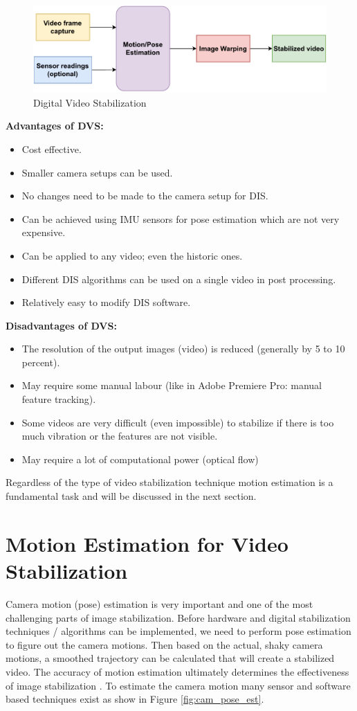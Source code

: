 \begin{figure}[H]
\centering
\includegraphics[scale=0.75]{images/fig_chapter2/2_1_dis.pdf}
\caption{Digital Video Stabilization}
\label{fig:dis}
\end{figure}

\textbf{Advantages of DVS: }
\begin{itemize}
\item Cost effective.
\item Smaller camera setups can be used.
\item No changes need to be made to the camera setup for DIS.
\item Can be achieved using IMU sensors for pose estimation which are not very expensive.
\item Can be applied to any video; even the historic ones.
\item Different DIS algorithms can be used on a single video in post processing.
\item Relatively easy to modify DIS software.
\end{itemize}

\textbf{Disadvantages of DVS:}
\begin{itemize}
\item The resolution of the output images (video) is reduced (generally by 5 to 10 percent).
\item May require some manual labour (like in Adobe Premiere Pro: manual feature tracking).
\item Some videos are very difficult (even impossible) to stabilize if there is too much vibration or the features are not visible.
\item May require a lot of computational power (optical flow)
\end{itemize}

Regardless of the type of video stabilization technique motion estimation is a fundamental task and will be discussed in the next section.

\section{Motion Estimation for Video Stabilization}
\label{sec:motion_estimation}
Camera motion (pose) estimation is very important and one of the most challenging parts of image stabilization. Before hardware and digital stabilization techniques / algorithms can be implemented, we need to perform pose estimation to figure out the camera motions. Then based on the actual, shaky camera motions, a smoothed trajectory can be calculated that will create a stabilized video. The accuracy of motion estimation ultimately determines the effectiveness of image stabilization \citep{ryu2012robust}. To estimate the camera motion many sensor and software based techniques exist as show in Figure \ref{fig:cam_pose_est}.


